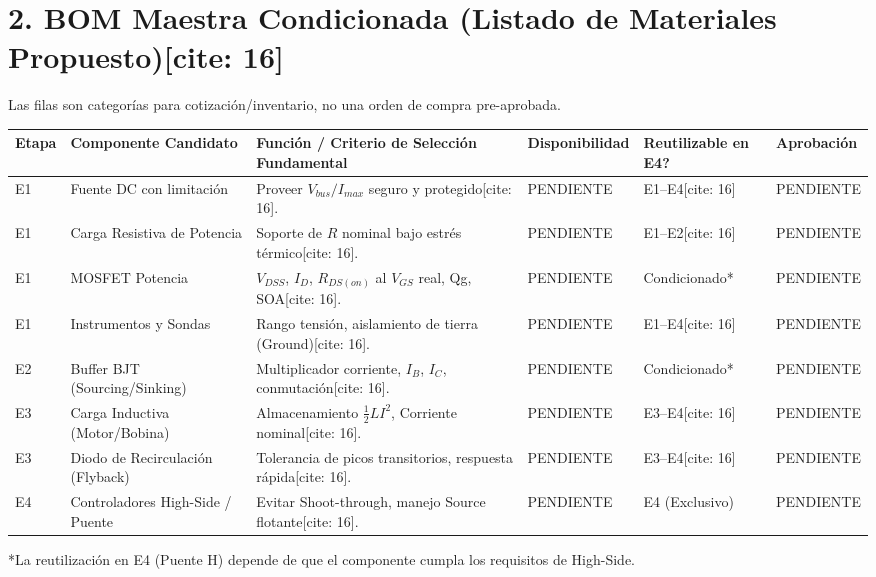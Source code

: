 \documentclass[10pt, a4paper, landscape]{article}
\begin{document}
\vspace{0.3cm}
\section*{2. BOM Maestra Condicionada (Listado de Materiales Propuesto)[cite: 16]}
Las filas son categorías para cotización/inventario, no una orden de compra pre-aprobada. 

\renewcommand{\arraystretch}{1.2}
\begin{tabularx}{\textwidth}{|p{1.2cm}|p{4.5cm}|>{\raggedright\arraybackslash}X|p{2.5cm}|p{2cm}|p{2cm}|}
\hline
\rowcolor{ucbblue!20}
\textbf{Etapa} & \textbf{Componente Candidato} & \textbf{Función / Criterio de Selección Fundamental} & \textbf{Disponibilidad} & \textbf{Reutilizable en E4?} & \textbf{Aprobación} \\ \hline
E1 & Fuente DC con limitación & Proveer $V_{bus} / I_{max}$ seguro y protegido[cite: 16]. & PENDIENTE & E1--E4[cite: 16] & PENDIENTE \\ \hline
E1 & Carga Resistiva de Potencia & Soporte de $R$ nominal bajo estrés térmico[cite: 16]. & PENDIENTE & E1--E2[cite: 16] & PENDIENTE \\ \hline
E1 & MOSFET Potencia & $V_{DSS}$, $I_D$, $R_{DS(on)}$ al $V_{GS}$ real, Qg, SOA[cite: 16]. & PENDIENTE & Condicionado* & PENDIENTE \\ \hline
E1 & Instrumentos y Sondas & Rango tensión, aislamiento de tierra (Ground)[cite: 16]. & PENDIENTE & E1--E4[cite: 16] & PENDIENTE \\ \hline
E2 & Buffer BJT (Sourcing/Sinking) & Multiplicador corriente, $I_B$, $I_C$, conmutación[cite: 16]. & PENDIENTE & Condicionado* & PENDIENTE \\ \hline
E3 & Carga Inductiva (Motor/Bobina) & Almacenamiento $\frac{1}{2} L I^2$, Corriente nominal[cite: 16]. & PENDIENTE & E3--E4[cite: 16] & PENDIENTE \\ \hline
E3 & Diodo de Recirculación (Flyback) & Tolerancia de picos transitorios, respuesta rápida[cite: 16]. & PENDIENTE & E3--E4[cite: 16] & PENDIENTE \\ \hline
E4 & Controladores High-Side / Puente & Evitar Shoot-through, manejo Source flotante[cite: 16]. & PENDIENTE & E4 (Exclusivo) & PENDIENTE \\ \hline
\end{tabularx}
\vspace{0.1cm}
\small{*La reutilización en E4 (Puente H) depende de que el componente cumpla los requisitos de High-Side.}
\end{document}
